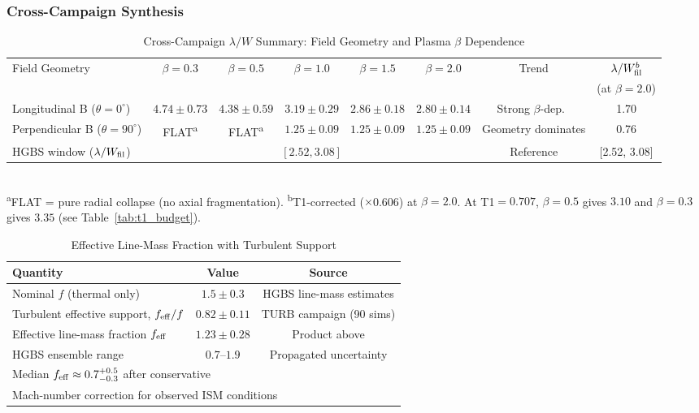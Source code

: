 \documentclass[twoside,twocolumn]{mnras}
\begin{document}
\subsubsection{Cross-Campaign Synthesis}
\label{sec:cross_campaign_synthesis}

\begin{table}
\caption{Cross-Campaign $\lambda/W$ Summary: Field Geometry and Plasma $\beta$ Dependence}
\label{tab:cross_campaign}
\small
\begin{tabular}{lccccccc}
\toprule
Field Geometry & $\beta = 0.3$ & $\beta = 0.5$ & $\beta = 1.0$ & $\beta = 1.5$ & $\beta = 2.0$ & Trend & $\lambda/W_{\rm fil}^{b}$ \\
 & & & & & & & (at $\beta=2.0$) \\
\midrule
Longitudinal B ($\theta = 0^\circ$) & $4.74 \pm 0.73$ & $4.38 \pm 0.59$ & $3.19 \pm 0.29$ & $2.86 \pm 0.18$ & $2.80 \pm 0.14$ & Strong $\beta$-dep.\ & 1.70 \\
Perpendicular B ($\theta = 90^\circ$) & FLAT\textsuperscript{a} & FLAT\textsuperscript{a} & $1.25 \pm 0.09$ & $1.25 \pm 0.09$ & $1.25 \pm 0.09$ & Geometry dominates & 0.76 \\
\midrule
HGBS window ($\lambda/W_{\rm fil}$) & \multicolumn{5}{c}{$[2.52, 3.08]$} & Reference & [2.52, 3.08] \\
\bottomrule
\end{tabular}
\\[2pt]
\footnotesize
\textsuperscript{a}FLAT = pure radial collapse (no axial fragmentation). \hspace{1em}
\textsuperscript{b}T1-corrected ($\times$0.606) at $\beta=2.0$. At T1$=0.707$, $\beta=0.5$ gives $3.10$ and $\beta=0.3$ gives $3.35$ (see Table~\ref{tab:t1_budget}).
\end{table}

\begin{table}
\caption{Effective Line-Mass Fraction with Turbulent Support}
\label{tab:feff}
\small
\begin{tabular}{lcc}
\toprule
Quantity & Value & Source \\
\midrule
Nominal $f$ (thermal only) & $1.5 \pm 0.3$ & HGBS line-mass estimates \\
Turbulent effective support, $f_{\rm eff}/f$ & $0.82 \pm 0.11$ & TURB campaign (90 sims) \\
Effective line-mass fraction $f_{\rm eff}$ & $1.23 \pm 0.28$ & Product above \\
HGBS ensemble range & $0.7$--$1.9$ & Propagated uncertainty \\
\midrule
\multicolumn{3}{l}{\footnotesize Median $f_{\rm eff} \approx 0.7^{+0.5}_{-0.3}$ after conservative}\\
\multicolumn{3}{l}{\footnotesize Mach-number correction for observed ISM conditions}\\
\bottomrule
\end{tabular}
\end{table}
\end{document}
